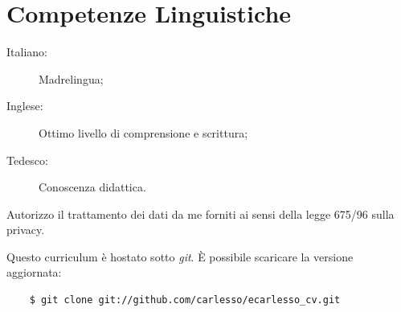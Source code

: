 \documentclass[pdftex, a4paper, 11pt]{article}
\begin{document}
\section*{Competenze Linguistiche}
\begin{description}
\item[Italiano:] Madrelingua;
\item[Inglese:] Ottimo livello di comprensione e scrittura;
\item[Tedesco:] Conoscenza didattica.
\end{description}


\vfill

Autorizzo il trattamento dei dati da me forniti ai sensi della legge
675/96 sulla privacy.

\vspace{1cm}

\footnotesize {Questo curriculum \`e hostato sotto {\em git}. \`E possibile scaricare la versione aggiornata:}
\begin{verbatim}
    $ git clone git://github.com/carlesso/ecarlesso_cv.git
\end{verbatim}
\end{document}
